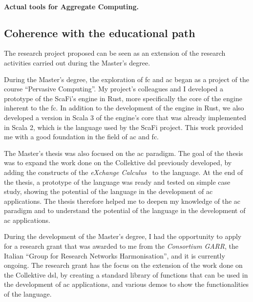 \documentclass[12pt, a4paper]{article}
\newcommand{\note}[3]{\todo[inline,linecolor=#1,backgroundcolor=#1!25,bordercolor=#1]{\textbf{#2:} #3}}
\newcommand{\angela}[1]{\note{blue}{Angela}{#1}}
\begin{document}
\sloppypar
\paragraph{Actual tools for Aggregate Computing.}

\subsection{Coherence with the educational path}\label{subsec:coherence-with-the-educational-path}

The research project proposed can be seen as an extension of the research activities
carried out during the Master's degree.

During the Master's degree,
the exploration of \ac{fc} and \ac{ac} began as a project of the course ``Pervasive Computing''.
%
My project's colleagues and I developed a prototype of the ScaFi's engine in Rust,
more specifically the core of the engine inherent to the \ac{fc}.
%
In addition to the development of the engine in Rust,
we also developed a version in Scala 3 of the engine's core that was already implemented in Scala 2,
which is the language used by the ScaFi project.
%
This work provided me with a good foundation in the field of \ac{ac} and \ac{fc}.

The Master's thesis was also focused on the \ac{ac} paradigm.
%
The goal of the thesis was to expand the work done on the Collektive \ac{dsl} previously developed,
by adding the constructs of the \emph{eXchange Calculus}~\cite{AudritoCDSV24} to the language. \angela{todo explain xc and collektive?}
%
At the end of the thesis, a prototype of the language was ready and tested on simple case study,
showing the potential of the language in the development of \ac{ac} applications.
%
The thesis therefore helped me to deepen my knowledge of the \ac{ac} paradigm and to understand the potential
of the language in the development of \ac{ac} applications.

During the development of the Master's degree,
I had the opportunity to apply for a research grant that was awarded to me from the \emph{Consortium GARR},
the Italian ``Group for Research Networks Harmonisation'',
and it is currently ongoing.
%
The research grant has the focus on the extension of the work done on the Collektive \ac{dsl},
by creating a standard library of functions that can be used in the development of \ac{ac} applications,
and various demos to show the functionalities of the language.
\end{document}
